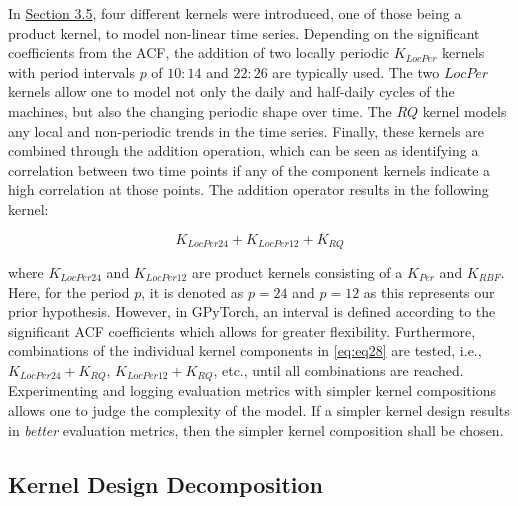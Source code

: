 In \hyperlink{subsection.3.5}{Section 3.5}, four different kernels were introduced, one of those being a product kernel, to model non-linear time series. Depending on the significant coefficients from the ACF, the addition of two locally periodic $K_{LocPer}$ kernels with period intervals $p$ of $10:14$ and $22:26$ are typically used. The two $LocPer$ kernels allow one to model not only the daily and half-daily cycles of the machines, but also the changing periodic shape over time. The $RQ$ kernel models any local and non-periodic trends in the time series. Finally, these kernels are combined through the addition operation, which can be seen as identifying a correlation between two time points if any of the component kernels indicate a high correlation at those points. The addition operator results in the following kernel:

\begin{equation}
    K_{LocPer24} + K_{LocPer12} + K_{RQ}
\label{eq:eq28}
\end{equation}

where $K_{LocPer24}$  and $K_{LocPer12}$ are product kernels consisting of a $K_{Per}$ and $K_{RBF}$. Here, for the period $p$, it is denoted as $p = 24$ and $p = 12$ as this represents our prior hypothesis. However, in GPyTorch, an interval is defined according to the significant ACF coefficients which allows for greater flexibility. Furthermore, combinations of the individual kernel components in \ref{eq:eq28} are tested, i.e., $K_{LocPer24} + K_{RQ}$, $K_{LocPer12} + K_{RQ}$, etc., until all combinations are reached. Experimenting and logging evaluation metrics with simpler kernel compositions allows one to judge the complexity of the model. If a simpler kernel design results in \textit{better} evaluation metrics, then the simpler kernel composition shall be chosen. 

\subsection{Kernel Design Decomposition}

